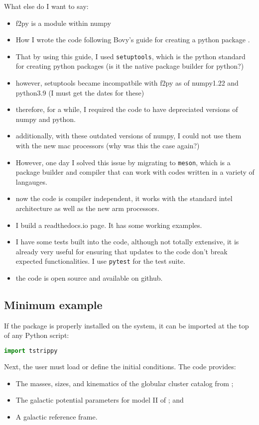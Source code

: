 \documentclass{article}
\begin{document}
    What else do I want to say: 
    \begin{itemize}
        \item f2py is a module within numpy \citep{numpy_f2py_manual,2020Natur.585..357H}
        \item How I wrote the code following Bovy's guide for creating a python package \citep{pythonpackagingguide}.
        \item That by using this guide, I used \texttt{setuptools}, which is the python standard for creating python packages (is it the native package builder for python?)
        \item however, setuptools became incompatbile with f2py as of numpy1.22 and python3.9 (I must get the dates for these)
        \item therefore, for a while, I required the code to have depreciated versions of numpy and python. 
        \item additionally, with these outdated versions of numpy, I could not use them with the new mac processors (why was this the case again?)
        \item However, one day I solved this issue by migrating to \texttt{meson}, which is a package builder and compiler that can work with codes written in a variety of langauges.
        \item now the code is compiler independent, it works with the standard intel architecture as well as the new arm processors. 
        \item I build a readthedocs.io page. It has some working examples. 
        \item I have some tests built into the code, although not totally extensive, it is already very useful for ensuring that updates to the code don't break expected functionalities. I use \texttt{pytest} for the test suite. 
        \item the code is open source and available on github. 
    \end{itemize}

    \subsection{Minimum example}
        If the package is properly installed on the system, it can be imported at the top of any Python script:
        \small
        \begin{lstlisting}[language=python]
            import tstrippy    
        \end{lstlisting}
        \normalsize
        Next, the user must load or define the initial conditions. The code provides:
        \begin{itemize}
            \item The masses, sizes, and kinematics of the globular cluster catalog from \citet{2018MNRAS.478.1520B};
            \item The galactic potential parameters for model II of \citet{2017A&A...598A..66P}; and
            \item A galactic reference frame.
        \end{itemize}
\end{document}
